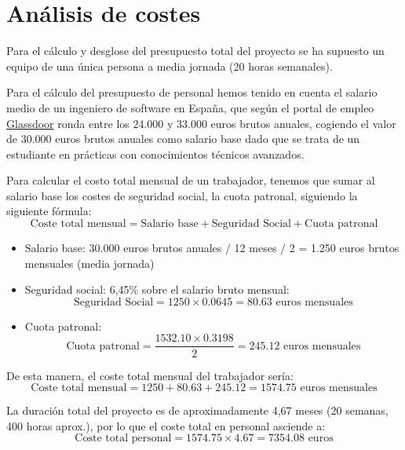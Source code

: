\section{Análisis de costes}
\label{sec:presupuesto}
Para el cálculo y desglose del presupuesto total del proyecto se ha supuesto un equipo de una única persona a media jornada (20 horas semanales).

Para el cálculo del presupuesto de personal hemos tenido en cuenta el salario medio de un ingeniero de software en España, que según el portal de empleo \href{https://www.glassdoor.es/Sueldos/granada-software-engineer-sueldo-SRCH_IL.0,7_IC2614045_KO8,25.htm}{Glassdoor} ronda entre los 24.000 y 33.000 euros brutos anuales, cogiendo el valor de 30.000 euros brutos anuales como salario base dado que se trata de un estudiante en prácticas con conocimientos técnicos avanzados.

Para calcular el costo total mensual de un trabajador, tenemos que sumar al salario base los costes de seguridad social, la cuota patronal, siguiendo la siguiente fórmula:
\begin{equation}
    \text{Coste total mensual} = \text{Salario base} + \text{Seguridad Social} + \text{Cuota patronal}
\end{equation}
\begin{itemize}
    \item Salario base: 30.000 euros brutos anuales / 12 meses / 2 = 1.250 euros brutos mensuales (media jornada)
    \item Seguridad social: 6,45\% sobre el salario bruto mensual:
        \begin{equation}
            \text{Seguridad Social} = 1250 \times 0.0645 = 80.63 \text{ euros mensuales}
        \end{equation}
    \item Cuota patronal: 
        \begin{equation}
            \text{Cuota patronal} = \dfrac{1532.10 \times 0.3198}{2} = 245.12 \text{ euros mensuales}
        \end{equation}
\end{itemize}

De esta manera, el coste total mensual del trabajador sería:
\begin{equation}
    \text{Coste total mensual} = 1250 + 80.63 + 245.12 = 1574.75 \text{ euros mensuales}
\end{equation}

La duración total del proyecto es de aproximadamente 4,67 meses (20 semanas, 400 horas aprox.), por lo que el coste total en personal asciende a:
\begin{equation}
    \text{Coste total personal} = 1574.75 \times 4.67 = 7354.08 \text{ euros}
\end{equation}

